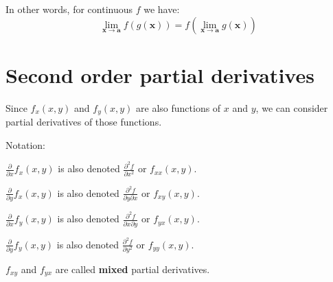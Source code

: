 \documentclass[11pt]{article}
\begin{document}
In other words, for continuous \(f\) we have:
\[\lim_{\boldsymbol{x} \rightarrow \boldsymbol{a}} f(g(\boldsymbol{x})) = f \left(\lim_{\boldsymbol{x} \rightarrow \boldsymbol{a}} g(\boldsymbol{x}) \right)\]

\newpage
\section{Second order partial derivatives}
\label{sec:orgbe36423}
Since \(f_x(x, y)\) and \(f_y(x, y)\) are also functions of \(x\) and \(y\), we can consider partial derivatives of those functions.


Notation:


\(\frac{\partial}{\partial x} f_x (x, y)\) is also denoted \(\frac{\partial^2 f}{\partial x^2}\) or \(f_{xx}(x, y)\).


\(\frac{\partial}{\partial y} f_x (x, y)\) is also denoted \(\frac{\partial^2 f}{\partial y \partial x}\) or \(f_{xy}(x, y)\).


\(\frac{\partial}{\partial x} f_y (x, y)\) is also denoted \(\frac{\partial^2 f}{\partial x \partial y}\) or \(f_{yx}(x, y)\).


\(\frac{\partial}{\partial y} f_y (x, y)\) is also denoted \(\frac{\partial^2 f}{\partial y^2}\) or \(f_{yy}(x, y)\).


\(f_{xy}\) and \(f_{yx}\) are called \textbf{mixed} partial derivatives.
\end{document}
